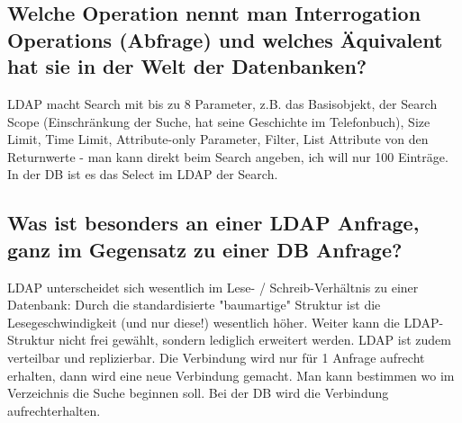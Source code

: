 \subsection{Welche Operation nennt man Interrogation Operations (Abfrage) und welches Äquivalent hat sie in der Welt der Datenbanken?}
LDAP macht Search mit bis zu 8 Parameter, z.B. das Basisobjekt, der Search Scope (Einschränkung der Suche, hat seine Geschichte im Telefonbuch), Size Limit, Time Limit, Attribute-only Parameter, Filter, List Attribute von den Returnwerte - man kann direkt beim Search angeben, ich will nur 100 Einträge. In der DB ist es das Select im LDAP der Search.

\subsection{Was ist besonders an einer LDAP Anfrage, ganz im Gegensatz zu einer DB Anfrage?}
LDAP unterscheidet sich wesentlich im Lese- / Schreib-Verhältnis zu einer Datenbank: Durch die standardisierte "baumartige" Struktur ist die Lesegeschwindigkeit (und nur diese!) wesentlich höher. Weiter kann die LDAP-Struktur nicht frei gewählt, sondern lediglich erweitert werden. LDAP ist zudem verteilbar und replizierbar. Die Verbindung wird nur für 1 Anfrage aufrecht erhalten, dann wird eine neue Verbindung gemacht. Man kann bestimmen wo im Verzeichnis die Suche beginnen soll. Bei der DB wird die Verbindung aufrechterhalten.